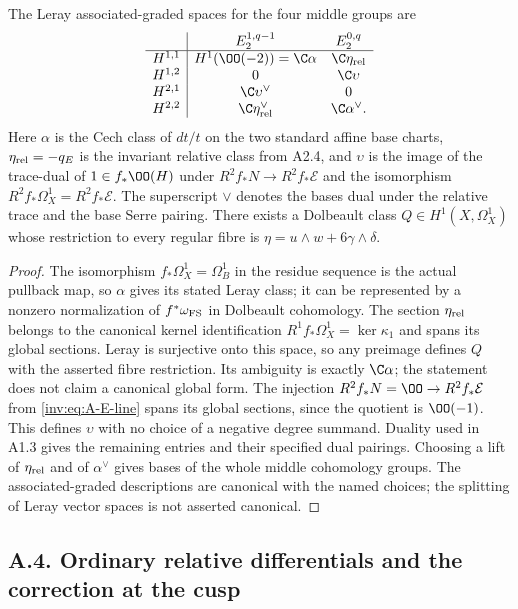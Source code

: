\begin{proposition}\label{inv:A3.2}
The Leray associated-graded spaces for the four middle groups are
\[
\begin{array}{c|cc}
&E_2^{1,q-1}&E_2^{0,q}\\\hline
H^{1,1}&H^1(\OO(-2))=\C\alpha&\C\eta_{\rm rel}\\
H^{1,2}&0&\C\upsilon\\
H^{2,1}&\C\upsilon^\vee&0\\
H^{2,2}&\C\eta_{\rm rel}^\vee&\C\alpha^\vee.
\end{array}
\]
Here $\alpha$ is the Cech class of $dt/t$ on the two standard affine
base charts, $\eta_{\rm rel}=-q_E$ is the invariant relative class
from A2.4, and $\upsilon$ is the image of the trace-dual of
$1\in f_*\OO(H)$ under $R^2f_*N\to R^2f_*\mathcal E$ and the
isomorphism $R^2f_*\Omega_X^1=R^2f_*\mathcal E$.
The superscript $\vee$ denotes the bases dual under the relative
trace and the base Serre pairing.  There exists a Dolbeault class
$Q\in H^1(X,\Omega_X^1)$ whose restriction to every regular fibre
is $\eta=u\wedge w+6\gamma\wedge\delta$.
\end{proposition}
\begin{proof}
The isomorphism $f_*\Omega_X^1=\Omega_B^1$ in the residue sequence
is the actual pullback map, so $\alpha$ gives its stated Leray
class; it can be represented by a nonzero normalization of
$f^*\omega_{\rm FS}$ in Dolbeault cohomology.  The section
$\eta_{\rm rel}$ belongs to the canonical kernel identification
$R^1f_*\Omega_X^1=\ker\kappa_1$ and spans its global sections.
Leray is surjective onto this space, so any preimage defines $Q$
with the asserted fibre restriction.  Its ambiguity is exactly
$\C\alpha$; the statement does not claim a canonical global form.
The injection $R^2f_*N=\OO\to R^2f_*\mathcal E$ from
\eqref{inv:eq:A-E-line} spans its global sections, since the quotient
is $\OO(-1)$.  This defines $\upsilon$ with no choice of a negative
degree summand.  Duality used in A1.3 gives the remaining entries
and their specified dual pairings.  Choosing a lift of
$\eta_{\rm rel}$ and of $\alpha^\vee$ gives bases of the whole
middle cohomology groups.  The associated-graded descriptions are
canonical with the named choices; the splitting of Leray vector
spaces is not asserted canonical.
\end{proof}

\subsection{A.4. Ordinary relative differentials and the correction at the cusp}


